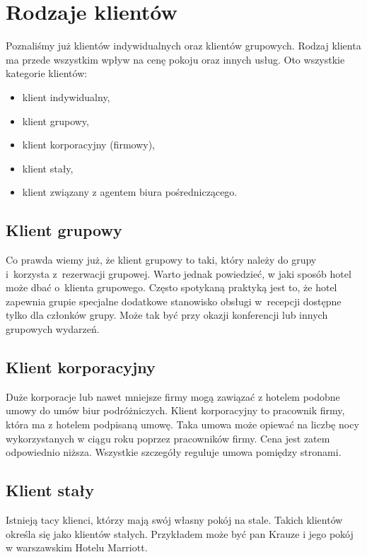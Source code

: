 \documentclass[a4paper,onecolumn,oneside,11pt,wide,floatssmall]{mwrep}
\theoremstyle{definition}
\theoremstyle{plain}%
\theoremstyle{remark}
\begin{document}
\section{Rodzaje klientów}
\label{rodzaje-klientow}
Poznaliśmy już klientów indywidualnych oraz klientów grupowych. Rodzaj 
klienta ma przede wszystkim wpływ na cenę pokoju oraz innych usług. Oto 
wszystkie kategorie klientów:

\begin{itemize}
  \item klient indywidualny,
  \item klient grupowy,
  \item klient korporacyjny (firmowy),
  \item klient stały,
  \item klient związany z agentem biura pośredniczącego.
\end{itemize}

\subsection{Klient grupowy}
Co prawda wiemy już, że klient grupowy to taki, który należy do grupy \mbox{i 
korzysta} \mbox{z rezerwacji} grupowej. Warto jednak powiedzieć, w jaki sposób hotel
może dbać \mbox{o klienta} grupowego. Często spotykaną praktyką jest to, że hotel 
zapewnia grupie specjalne dodatkowe stanowisko obsługi \mbox{w recepcji} dostępne 
tylko dla członków grupy. Może tak być przy okazji konferencji lub innych 
grupowych wydarzeń.

\subsection{Klient korporacyjny}
Duże korporacje lub nawet mniejsze firmy mogą zawiązać z hotelem podobne 
umowy do umów biur podróżniczych. Klient korporacyjny to pracownik firmy, 
która ma z hotelem podpisaną umowę. Taka umowa może opiewać na liczbę nocy 
wykorzystanych w ciągu roku poprzez pracowników firmy. Cena jest zatem 
odpowiednio niższa. Wszystkie szczegóły reguluje umowa pomiędzy stronami.

\subsection{Klient stały}
Istnieją tacy klienci, którzy mają swój własny pokój na stale. Takich 
klientów określa się jako klientów stałych. Przykładem może być pan Krauze i 
jego pokój w warszawskim Hotelu Marriott.
\end{document}
